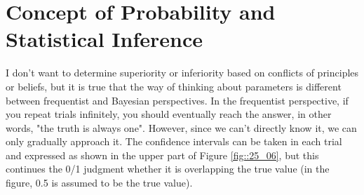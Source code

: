 \documentclass{ltjsarticle}
\begin{document}
\section{Concept of Probability and Statistical Inference}


I don't want to determine superiority or inferiority based on conflicts of principles or beliefs, but it is true that the way of thinking about parameters is different between frequentist and Bayesian perspectives. In the frequentist perspective, if you repeat trials infinitely, you should eventually reach the answer, in other words, "the truth is always one". However, since we can't directly know it, we can only gradually approach it. The confidence intervals can be taken in each trial and expressed as shown in the upper part of Figure \ref{fig::25_06}, but this continues the 0/1 judgment whether it is overlapping the true value (in the figure, 0.5 is assumed to be the true value).
\end{document}
